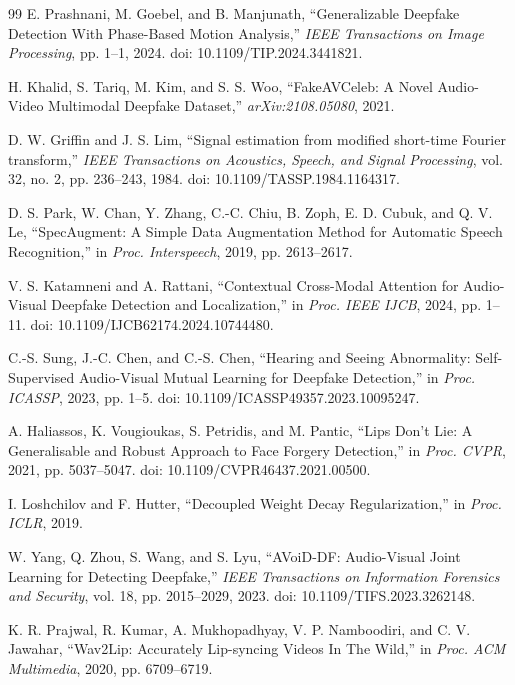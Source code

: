 \begin{thebibliography}{99}
E. Prashnani, M. Goebel, and B. Manjunath, ``Generalizable Deepfake Detection With Phase-Based Motion Analysis,'' \textit{IEEE Transactions on Image Processing}, pp. 1--1, 2024. doi: 10.1109/TIP.2024.3441821.

H. Khalid, S. Tariq, M. Kim, and S. S. Woo, ``FakeAVCeleb: A Novel Audio-Video Multimodal Deepfake Dataset,'' \textit{arXiv:2108.05080}, 2021.

D. W. Griffin and J. S. Lim, ``Signal estimation from modified short-time Fourier transform,'' \textit{IEEE Transactions on Acoustics, Speech, and Signal Processing}, vol. 32, no. 2, pp. 236--243, 1984. doi: 10.1109/TASSP.1984.1164317.

D. S. Park, W. Chan, Y. Zhang, C.-C. Chiu, B. Zoph, E. D. Cubuk, and Q. V. Le, ``SpecAugment: A Simple Data Augmentation Method for Automatic Speech Recognition,'' in \textit{Proc. Interspeech}, 2019, pp. 2613--2617.

V. S. Katamneni and A. Rattani, ``Contextual Cross-Modal Attention for Audio-Visual Deepfake Detection and Localization,'' in \textit{Proc. IEEE IJCB}, 2024, pp. 1--11. doi: 10.1109/IJCB62174.2024.10744480.

C.-S. Sung, J.-C. Chen, and C.-S. Chen, ``Hearing and Seeing Abnormality: Self-Supervised Audio-Visual Mutual Learning for Deepfake Detection,'' in \textit{Proc. ICASSP}, 2023, pp. 1--5. doi: 10.1109/ICASSP49357.2023.10095247.

A. Haliassos, K. Vougioukas, S. Petridis, and M. Pantic, ``Lips Don't Lie: A Generalisable and Robust Approach to Face Forgery Detection,'' in \textit{Proc. CVPR}, 2021, pp. 5037--5047. doi: 10.1109/CVPR46437.2021.00500.

I. Loshchilov and F. Hutter, ``Decoupled Weight Decay Regularization,'' in \textit{Proc. ICLR}, 2019.

W. Yang, Q. Zhou, S. Wang, and S. Lyu, ``AVoiD-DF: Audio-Visual Joint Learning for Detecting Deepfake,'' \textit{IEEE Transactions on Information Forensics and Security}, vol. 18, pp. 2015--2029, 2023. doi: 10.1109/TIFS.2023.3262148.

K. R. Prajwal, R. Kumar, A. Mukhopadhyay, V. P. Namboodiri, and C. V. Jawahar, ``Wav2Lip: Accurately Lip-syncing Videos In The Wild,'' in \textit{Proc. ACM Multimedia}, 2020, pp. 6709--6719.


\end{thebibliography}
